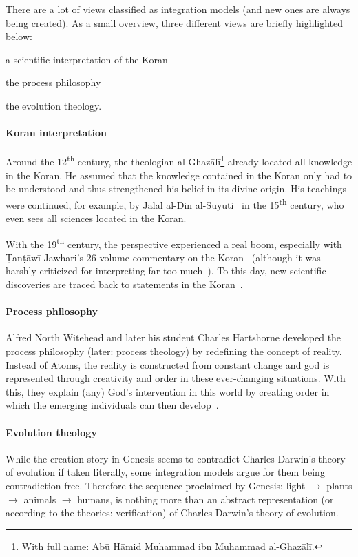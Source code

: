 There are a lot of views classified as integration models (and new ones are always being created). As a small overview, three different views are briefly highlighted below: \begin{inlist}
    \item a scientific interpretation of the Koran
    \item the process philosophy
    \item the evolution theology.
\end{inlist}


\paragraph{Koran interpretation}
Around the 12\textsuperscript{th} century, the theologian al-Ghazālī\footnote{With full name: Abū Hāmid Muhammad ibn Muhammad al-Ghazālī.} already located all knowledge in the Koran.
He assumed that the knowledge contained in the Koran only had to be understood and thus strengthened his belief in its divine origin.
His teachings were continued, for example, by Jalal al-Din al-Suyuti~\cite{abdurrahman2003kecsfu} in the 15\textsuperscript{th} century, who even sees all sciences located in the Koran.

With the 19\textsuperscript{th} century, the perspective experienced a real boom, especially with \d{T}an\d{t}āwī Jawhari's 26 volume commentary on the Koran~\cite{jawhari1932jawahir} (although it was harshly criticized for interpreting far too much~\cite[p.~48]{Demirci2016}).
To this day, new scientific discoveries are traced back to statements in the Koran~\cite{Demirci2016}.

\paragraph{Process philosophy}
Alfred North Witehead and later his student Charles Hartshorne developed the process philosophy (later: process theology) by redefining the concept of reality.
Instead of Atoms, the reality is constructed from constant change
and god is represented through creativity and order in these ever-changing situations.
With this, they explain (any) God's intervention in this world by creating order in which the emerging individuals can then develop~\cite{whitehead1957process}.


\paragraph{Evolution theology}
While the creation story in Genesis seems to contradict Charles Darwin's theory of evolution if taken literally, some integration models argue for them being contradiction free.
{\def\mto{\(\to\)}
Therefore the sequence proclaimed by Genesis: light \mto{} plants \mto{} animals \mto{} humans, is nothing more than an abstract representation (or according to the theories: verification) of Charles Darwin's theory of evolution.
}

